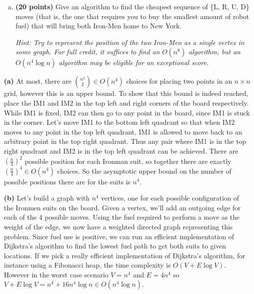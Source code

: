 \documentclass[11pt,letterpaper]{article}
\begin{document}
\begin{problem}
\begin{enumerate}[(a)]
        \item {\bf (20 points)} Give an algorithm to find the cheapest sequence of \{L, R, U, D\} moves (that is, the one that requires you to buy the smallest amount of robot fuel) that will bring both Iron-Men home to New York. 
        
        \emph{Hint: Try to represent the position of the two Iron-Men as a single vertex in some graph. For full credit, it suffices to find an $O(n^8)$ algorithm, but an $O(n^4 \log n)$ algorithm may be eligible for an exceptional score.}
    \end{enumerate}
\end{problem}

\begin{solution}
    \textbf{(a)} At most, there are $\binom{n^2}{2}\in O(n^4)$ choices for placing two points in an $n\times n$ grid, however this is an upper bound. To show that this bound is indeed reached, place the IM1 and IM2 in the top left and right corners of the board respectively. While IM1 is fixed, IM2 can then go to any point in the board, since IM1 is stuck in the corner. Let's move IM1 to the bottom left quadrant so that when IM2 moves to any point in the top left quadrant, IM1 is allowed to move back to an arbitrary point in the top right quadrant. Thus any pair where IM1 is in the top right quadrant and IM2 is in the top left quadrant can be achieved. There are $\left(\frac{n}{4}\right)^2$ possible position for each Ironman suit, so together there are exactly $\left(\frac{n}{4}\right)^4\in O(n^4)$ choices. So the asymptotic upper bound on the number of possible positions there are for the suits is $n^4$.
    
    \textbf{(b)} Let's build a graph with $n^4$ vertices, one for each possible configuration of the Ironmen suits on the board. Given a vertex, we'll add an outgoing edge for each of the $4$ possible moves. Using the fuel required to perform a move as the weight of the edge, we now have a weighted directed graph representing this problem. Since fuel use is positive, we can run an efficient implementation of Dijkstra's algorithm to find the lowest fuel path to get both suits to given locations. If we pick a really efficient implementation of Dijkstra's algorithm, for instance using a Fibonacci heap, the time complexity is $O(V+E\log V)$. However in the worst case scenario $V=n^4$ and $E=4n^4$ so $V+E\log V=n^4+16n^4\log n\in O(n^4\log n)$.    
\end{solution}
\end{document}

